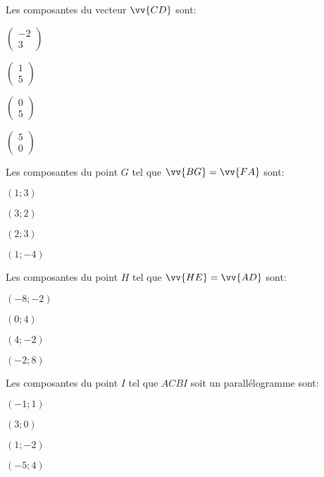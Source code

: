 \begin{QCM}
\begin{GroupeQCM}
\begin{exercice}Les composantes du vecteur $\vv{CD}$ sont:
\begin{ChoixQCM}{4}
\item $\left(\begin{array}{c}-2\\3\end{array}\right)$
\item $\left(\begin{array}{c}1\\5\end{array}\right)$
\item $\left(\begin{array}{c}0\\5\end{array}\right)$
\item $\left(\begin{array}{c}5\\0\end{array}\right)$
\end{ChoixQCM}
\begin{corrige}
\end{corrige}
\end{exercice}

\begin{exercice}Les composantes du point $G$ tel que $\vv{BG}=\vv{FA}$ sont: 
\begin{ChoixQCM}{4}
\item  $(1;3)$
\item  $(3;2)$
\item  $(2;3)$
\item  $(1;-4)$
\end{ChoixQCM}
\begin{corrige}
\end{corrige}
\end{exercice}
\begin{exercice}Les composantes du point $H$ tel que $\vv{HE}=\vv{AD}$ sont:
\begin{ChoixQCM}{4}
\item  $(-8;-2)$
\item  $(0;4)$
\item  $(4;-2)$
\item  $(-2;8)$
\end{ChoixQCM}
\begin{corrige}
\end{corrige}
\end{exercice}

\begin{exercice}Les composantes du point $I$ tel que $ACBI$ soit un parallélogramme sont:
\begin{ChoixQCM}{4}
\item  $(-1;1)$
\item  $(3;0)$
\item  $(1;-2)$
\item  $(-5;4)$
\end{ChoixQCM}
\end{exercice}
\begin{corrige}
\end{corrige}


\end{GroupeQCM}
\end{QCM}
